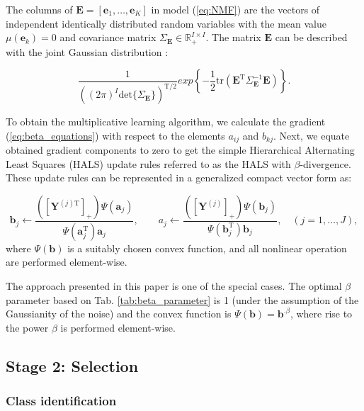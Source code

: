 \documentclass[3p,12pt]{elsarticle}
\begin{document}
The columns of $\mathbf{E}=[\mathbf{e}_1,\dots,\mathbf{e}_K]$ in model (\ref{eq:NMF}) are the vectors of independent identically distributed random variables with the mean value $\mu(\mathbf{e}_k)=0$ and covariance matrix $\Sigma_\mathbf{E} \in \mathbb{R}_+^{I\times I}$. The matrix $\mathbf{E}$ can be described with the joint Gaussian distribution \cite{tong2012multivariate}:

\begin{equation}
    \frac{1}{\left((2\pi)^I\mathrm{det}\{\Sigma_\mathbf{E}\} \right)^{\textrm{T}/2}}exp\left\{-\frac{1}{2}\mathrm{tr}(\mathbf{E}^\textrm{T}\Sigma_\mathbf{E}^{-1}\mathbf{E}) \right\}.
\end{equation}


To obtain the multiplicative learning algorithm, we calculate the gradient (\ref{eq:beta_equations}) with respect to the elements $a_{ij}$ and $b_{kj}$. Next, we equate obtained gradient components to zero to get the simple Hierarchical Alternating Least Squares (HALS) update rules \cite{cichocki2009nonnegative} referred to as the HALS with $\beta$-divergence. These update rules can be represented in a generalized compact vector form as: 

\begin{equation}
   \label{eq:beta_up_rules} 
   \mathbf{b}_j \leftarrow \frac{\left( \left[\mathbf{Y}^{(j)\textrm{T}} \right]_{+}\right)\Psi (\mathbf{a}_j) }{\Psi (\mathbf{a}_j^\textrm{T})\mathbf{a}_j}, \quad \quad a_j \leftarrow \frac{\left( \left[\mathbf{Y}^{(j)} \right]_{+}\right)\Psi (\mathbf{b}_j) }{\Psi (\mathbf{b}_j^\textrm{T})\mathbf{b}_j},  \quad (j=1,\dots,J),
\end{equation}
where $\Psi(\mathbf{b})$ is a suitably chosen convex function, and all nonlinear operation are performed element-wise.

The approach presented in this paper is one of the special cases. The optimal $\beta$ parameter based on Tab. \ref{tab:beta_parameter} is 1 (under the assumption of the Gaussianity of the noise) and the convex function is $\Psi(\mathbf{b})=\mathbf{b}^{.\beta}$, where rise to the power $\beta$ is performed element-wise. 
\subsection{Stage 2: Selection}
\subsubsection{Class identification}\label{ident}
\end{document}
